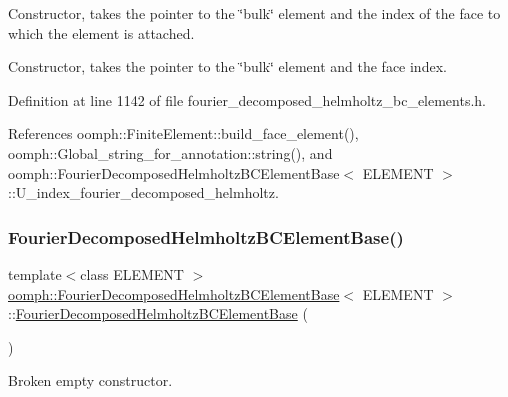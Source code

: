 Constructor, takes the pointer to the \char`\"{}bulk\char`\"{} element and the index of the face to which the element is attached. 

Constructor, takes the pointer to the \char`\"{}bulk\char`\"{} element and the face index. 

Definition at line 1142 of file fourier\+\_\+decomposed\+\_\+helmholtz\+\_\+bc\+\_\+elements.\+h.



References oomph\+::\+Finite\+Element\+::build\+\_\+face\+\_\+element(), oomph\+::\+Global\+\_\+string\+\_\+for\+\_\+annotation\+::string(), and oomph\+::\+Fourier\+Decomposed\+Helmholtz\+B\+C\+Element\+Base$<$ E\+L\+E\+M\+E\+N\+T $>$\+::\+U\+\_\+index\+\_\+fourier\+\_\+decomposed\+\_\+helmholtz.

\mbox{\label{classoomph_1_1FourierDecomposedHelmholtzBCElementBase_a0279036f276a91d48634674d4e371c0f}} 
\subsubsection{\texorpdfstring{Fourier\+Decomposed\+Helmholtz\+B\+C\+Element\+Base()}{FourierDecomposedHelmholtzBCElementBase()}\hspace{0.1cm}{\footnotesize\ttfamily [2/3]}}
{\footnotesize\ttfamily template$<$class E\+L\+E\+M\+E\+NT $>$ \\
\hyperlink{classoomph_1_1FourierDecomposedHelmholtzBCElementBase}{oomph\+::\+Fourier\+Decomposed\+Helmholtz\+B\+C\+Element\+Base}$<$ E\+L\+E\+M\+E\+NT $>$\+::\hyperlink{classoomph_1_1FourierDecomposedHelmholtzBCElementBase}{Fourier\+Decomposed\+Helmholtz\+B\+C\+Element\+Base} (\begin{DoxyParamCaption}{ }\end{DoxyParamCaption})\hspace{0.3cm}{\ttfamily [inline]}}



Broken empty constructor. 



